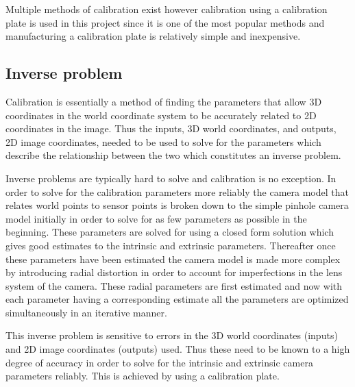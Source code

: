 \documentclass[12pt,oneside,openany,a4paper, %
english, %
masters-t, goldenblock]{usthesis}
\begin{document}

Multiple methods of calibration exist however calibration using a calibration plate is used in this project since it is one of the most popular methods and manufacturing a calibration plate is relatively simple and inexpensive.

\subsection{Inverse problem}
Calibration is essentially a method of finding the parameters that allow 3D coordinates in the world coordinate system to be accurately related to 2D coordinates in the image. Thus the inputs, 3D world coordinates, and outputs, 2D image coordinates, needed to be used to solve for the parameters which describe the relationship between the two which constitutes an inverse problem.

Inverse problems are typically hard to solve and calibration is no exception. In order to solve for the calibration parameters more reliably the camera model that relates world points to sensor points is broken down to the simple pinhole camera model initially in order to solve for as few parameters as possible in the beginning. These parameters are solved for using a closed form solution which gives good estimates to the intrinsic and extrinsic parameters. Thereafter once these parameters have been estimated the camera model is made more complex by introducing radial distortion in order to account for imperfections in the lens system of the camera. These radial parameters are first estimated and now with each parameter having a corresponding estimate all the parameters are optimized simultaneously in an iterative manner.

This inverse problem is sensitive to errors in the 3D world coordinates (inputs) and 2D image coordinates (outputs) used. Thus these need to be known to a high degree of accuracy in order to solve for the intrinsic and extrinsic camera parameters reliably. This is achieved by using a calibration plate.
\end{document}
